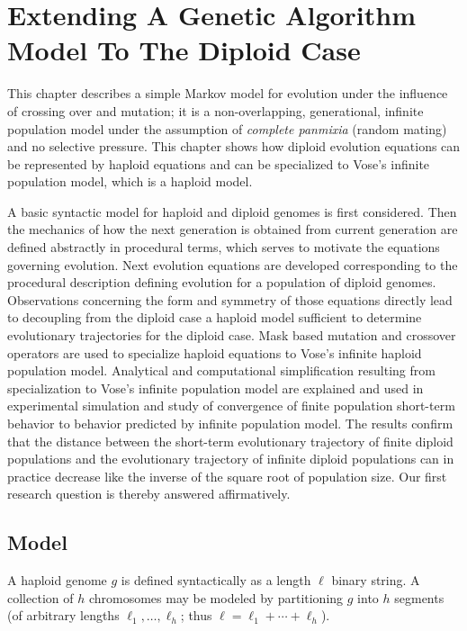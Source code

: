 \chapter{Extending A Genetic Algorithm Model To The Diploid Case} \label{ch:GA model Diploid}
This chapter describes a simple Markov model for evolution under the
influence of crossing over and mutation; it is a non-overlapping,
generational, infinite population model under the assumption of {\em complete panmixia} (random mating) and no
selective pressure. This chapter shows how diploid evolution equations can be represented by haploid equations 
and can be specialized to Vose's infinite population model, which is a haploid model.

A basic syntactic model for haploid and diploid genomes is first considered. 
Then the mechanics of how the next generation is obtained from current generation are
defined abstractly in procedural terms, which serves to motivate the equations governing evolution. 
Next evolution equations are developed corresponding to the
procedural description defining evolution for a population of
diploid genomes. Observations concerning the form and symmetry of
those equations directly lead to decoupling from the diploid case a
haploid model sufficient to determine evolutionary trajectories for
the diploid case. Mask based mutation and crossover operators are used to specialize 
haploid equations to Vose's infinite haploid population model. 
Analytical and computational simplification resulting from specialization to 
Vose's infinite population model are explained and used 
in experimental simulation and study of convergence of finite population 
short-term behavior to behavior predicted by infinite population model.    
The results confirm that the distance between the short-term
evolutionary trajectory of finite diploid populations and the
evolutionary trajectory of infinite diploid populations can in
practice decrease like the inverse of the square root of population
size.  Our first research question is thereby answered
affirmatively.

\section{Model} \label{Model}
A haploid genome $g$ is defined syntactically as a length $\ell$
binary string.  A collection of $h$ chromosomes may be modeled by
partitioning $g$ into $h$ segments (of arbitrary lengths $\ell_1,
\ldots , \ell_h$; thus $\ell = \ell_1 + \cdots + \ell_h$).

